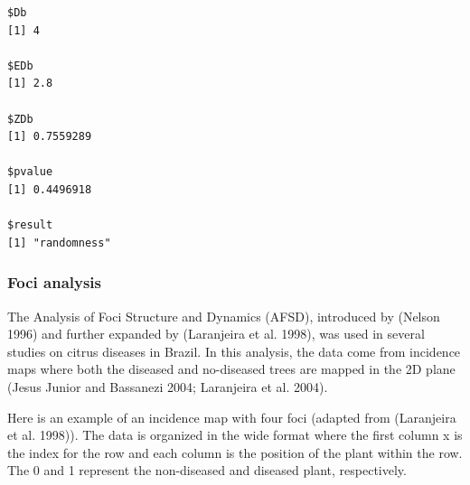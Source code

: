 \documentclass[
  letterpaper,
  DIV=11,
  numbers=noendperiod]{scrreprt}
\begin{document}
\begin{verbatim}
$Db
[1] 4

$EDb
[1] 2.8

$ZDb
[1] 0.7559289

$pvalue
[1] 0.4496918

$result
[1] "randomness"
\end{verbatim}

\hypertarget{foci-analysis}{%
\subsubsection{Foci analysis}\label{foci-analysis}}

The Analysis of Foci Structure and Dynamics (AFSD), introduced by
(Nelson 1996) and further expanded by (Laranjeira et al. 1998), was used
in several studies on citrus diseases in Brazil. In this analysis, the
data come from incidence maps where both the diseased and no-diseased
trees are mapped in the 2D plane (Jesus Junior and Bassanezi 2004;
Laranjeira et al. 2004).

Here is an example of an incidence map with four foci (adapted from
(Laranjeira et al. 1998)). The data is organized in the wide format
where the first column x is the index for the row and each column is the
position of the plant within the row. The 0 and 1 represent the
non-diseased and diseased plant, respectively.
\end{document}
